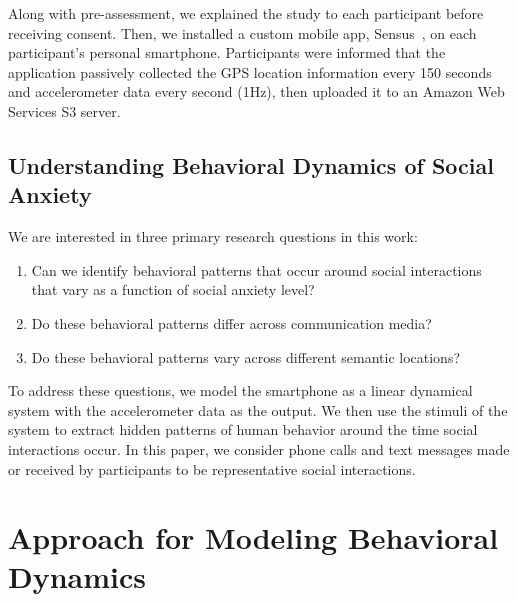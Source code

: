 Along with pre-assessment, we explained the study to each participant before receiving consent. Then, we installed a custom mobile app, Sensus~\cite{sensus, sensus-paper}, on each participant's personal smartphone. Participants were informed that the application passively collected the GPS location information every 150 seconds and accelerometer data every second (1Hz), then uploaded it to an Amazon Web Services S3 server.

\subsection{Understanding Behavioral Dynamics of Social Anxiety} 
We are interested in three primary research questions in this work: 
\begin{enumerate}
\item Can we identify behavioral patterns that occur around social interactions that vary as a function of social anxiety level?
\item Do these behavioral patterns differ across communication media?
\item Do these behavioral patterns vary across different semantic locations?
\end{enumerate}
To address these questions, we model the smartphone as a linear dynamical system with the accelerometer data as the output. We then use the stimuli of the system to extract hidden patterns of human behavior around the time social interactions occur.  In this paper, we consider phone calls and text messages made or received by participants to be representative social interactions.

\section{Approach for Modeling Behavioral Dynamics}
\label{sec:approach}

